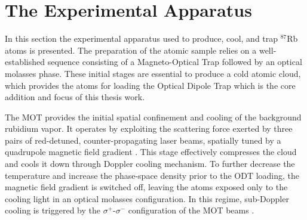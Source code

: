 \section{The Experimental Apparatus}\label{sec:cap_2_MOT}
In this section the experimental apparatus used to produce, cool, and trap $^{87}$Rb atoms is presented. The preparation of the atomic sample relies on a well-established sequence consisting of a Magneto-Optical Trap followed by an optical molasses phase. These initial stages are essential to produce a cold atomic cloud, which provides the atoms for loading the Optical Dipole Trap which is the core addition and focus of this thesis work.

The MOT provides the initial spatial confinement and cooling of the background rubidium vapor. It operates by exploiting the scattering force exerted by three pairs of red-detuned, counter-propagating laser beams, spatially tuned by a quadrupole magnetic field gradient \cite{metcalf1999}. This stage effectively compresses the cloud and cools it down through Doppler cooling mechanism.
To further decrease the temperature and increase the phase-space density prior to the ODT loading, the magnetic field gradient is switched off, leaving the atoms exposed only to the cooling light in an optical molasses configuration. In this regime, sub-Doppler cooling is triggered by the $\sigma^+$-$\sigma^-$ configuration of the MOT beams \cite{metcalf1999, Dalibard:89}. 
